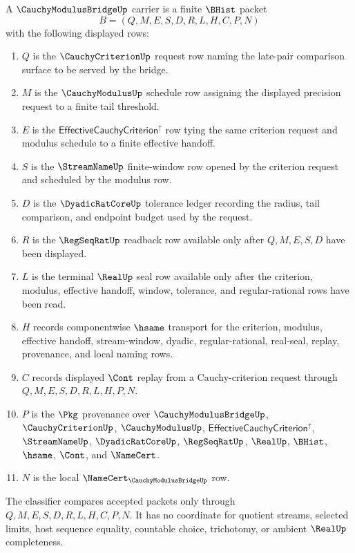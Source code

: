 \begin{definition}
\label{def:cauchy-modulus-bridge-carrier}
A $\CauchyModulusBridgeUp$ carrier is a finite $\BHist$ packet
$$
B=(Q,M,E,S,D,R,L,H,C,P,N)
$$
with the following displayed rows:
\begin{enumerate}
\item $Q$ is the $\CauchyCriterionUp$ request row naming the late-pair comparison surface to be served by the bridge.
\item $M$ is the $\CauchyModulusUp$ schedule row assigning the displayed precision request to a finite tail threshold.
\item $E$ is the $\mathsf{EffectiveCauchyCriterion}^{\uparrow}$ row tying the same criterion request and modulus schedule to a finite effective handoff.
\item $S$ is the $\StreamNameUp$ finite-window row opened by the criterion request and scheduled by the modulus row.
\item $D$ is the $\DyadicRatCoreUp$ tolerance ledger recording the radius, tail comparison, and endpoint budget used by the request.
\item $R$ is the $\RegSeqRatUp$ readback row available only after $Q,M,E,S,D$ have been displayed.
\item $L$ is the terminal $\RealUp$ seal row available only after the criterion, modulus, effective handoff, window, tolerance, and regular-rational rows have been read.
\item $H$ records componentwise $\hsame$ transport for the criterion, modulus, effective handoff, stream-window, dyadic, regular-rational, real-seal, replay, provenance, and local naming rows.
\item $C$ records displayed $\Cont$ replay from a Cauchy-criterion request through $Q,M,E,S,D,R,L,H,P,N$.
\item $P$ is the $\Pkg$ provenance over $\CauchyModulusBridgeUp$, $\CauchyCriterionUp$, $\CauchyModulusUp$, $\mathsf{EffectiveCauchyCriterion}^{\uparrow}$, $\StreamNameUp$, $\DyadicRatCoreUp$, $\RegSeqRatUp$, $\RealUp$, $\BHist$, $\hsame$, $\Cont$, and $\NameCert$.
\item $N$ is the local $\NameCert_{\CauchyModulusBridgeUp}$ row.
\end{enumerate}
The classifier compares accepted packets only through $Q,M,E,S,D,R,L,H,C,P,N$. It has no coordinate for quotient streams, selected limits, host sequence equality, countable choice, trichotomy, or ambient $\RealUp$ completeness.
\end{definition}

